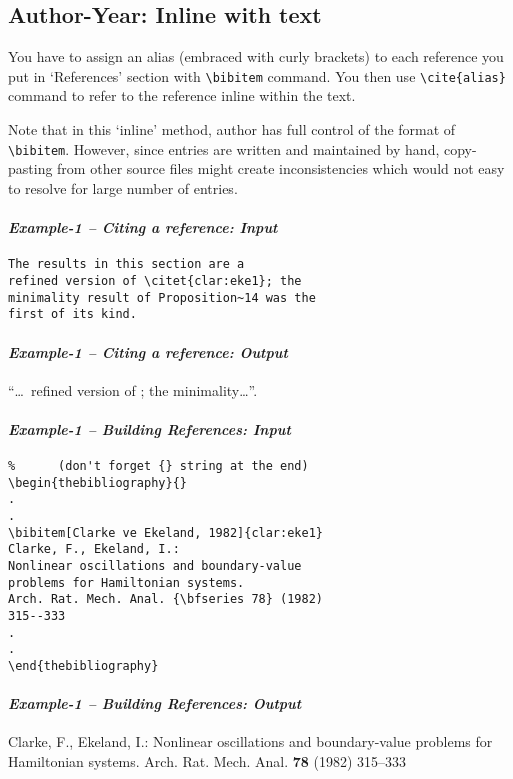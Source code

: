 \documentclass[usenatbib]{tjaa}
\begin{document}
\newpage
\subsection{Author-Year: Inline with text}

You have to assign an alias (embraced with curly brackets) to each reference
you put in `References' section with \verb|\bibitem| command.
You then use \verb|\cite{alias}| command to refer to the reference
inline within the text.

Note that in this `inline' method, author has full control of the format of
\verb|\bibitem|. However, since entries are written and maintained by hand,
copy-pasting from other source files might create inconsistencies which would
not easy to resolve for large number of entries.

\paragraph*{\itshape Example-1 -- Citing a reference: Input}
\begin{verbatim}
The results in this section are a
refined version of \citet{clar:eke1}; the
minimality result of Proposition~14 was the
first of its kind.
\end{verbatim}

\paragraph*{\itshape Example-1 -- Citing a reference: Output}
``\dots\ refined version of \citet{clar:eke1}; the minimality\dots''.

\paragraph*{\itshape Example-1 -- Building References: Input}
\begin{verbatim}
%      (don't forget {} string at the end)
\begin{thebibliography}{}
.
.
\bibitem[Clarke ve Ekeland, 1982]{clar:eke1}
Clarke, F., Ekeland, I.:
Nonlinear oscillations and boundary-value
problems for Hamiltonian systems.
Arch. Rat. Mech. Anal. {\bfseries 78} (1982)
315--333
.
.
\end{thebibliography}
\end{verbatim}

\paragraph*{\itshape Example-1 -- Building References: Output}
\begin{thebibliography}{}
 Clarke, F., Ekeland, I.: Nonlinear
oscillations and boundary-value problems for Hamiltonian systems.
Arch. Rat. Mech. Anal. {\bf 78} (1982) 315--333
\end{thebibliography}
\end{document}
